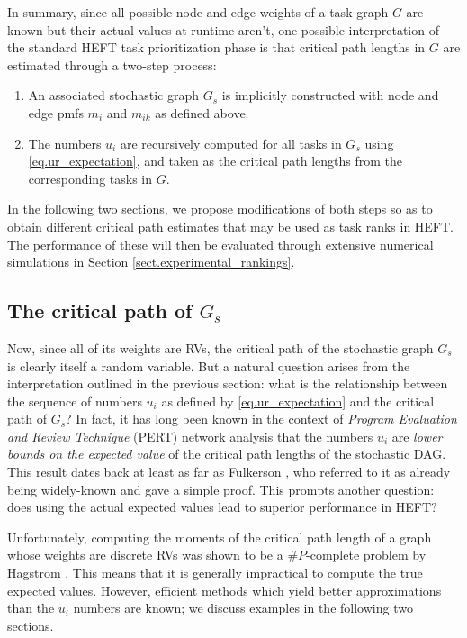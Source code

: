 \documentclass[12pt]{article}
\begin{document}
In summary, since all possible node and edge weights of a task graph $G$ are known but their actual values at runtime aren't, one possible interpretation of the standard HEFT task prioritization phase is that critical path lengths in $G$ are estimated through a two-step process:
\begin{enumerate}
	\item An associated stochastic graph $G_s$ is implicitly constructed with node and edge pmfs $m_i$ and $m_{ik}$ as defined above.   
	\item The numbers $u_i$ are recursively computed for all tasks in $G_s$ using \eqref{eq.ur_expectation}, and taken as the critical path lengths from the corresponding tasks in $G$.      
\end{enumerate}
In the following two sections, we propose modifications of both steps so as to obtain different critical path estimates that may be used as task ranks in HEFT. The performance of these will then be evaluated through extensive numerical simulations in Section \ref{sect.experimental_rankings}.

\subsection{The critical path of $G_s$}
\label{subsect.sharper_bounds}

Now, since all of its weights are RVs, the critical path of the stochastic graph $G_s$ is clearly itself a random variable. But a natural question arises from the interpretation outlined in the previous section: what is the relationship between the sequence of numbers $u_i$ as defined by \eqref{eq.ur_expectation} and the critical path of $G_s$? In fact, it has long been known in the context of {\em Program Evaluation and Review Technique} (PERT) network analysis that the numbers $u_i$ are {\em lower bounds on the expected value} of the critical path lengths of the stochastic DAG. This result dates back at least as far as Fulkerson \cite{fulk62}, who referred to it as already being widely-known and gave a simple proof. This prompts another question: does using the actual expected values lead to superior performance in HEFT?

Unfortunately, computing the moments of the critical path length of a graph whose weights are discrete RVs was shown to be a $\#P$-complete problem by Hagstrom \cite{hagstrom88}. This means that it is generally impractical to compute the true expected values. However, efficient methods which yield better approximations than the $u_i$ numbers are known; we discuss examples in the following two sections.  
\end{document}

